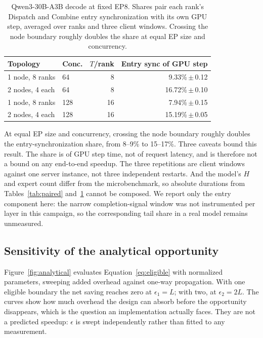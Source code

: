 \begin{table}[t]
\centering\small
\setlength{\tabcolsep}{5pt}
\begin{tabular}{llrr}
\toprule
Topology & Conc. & $T$/rank & Entry sync of GPU step\\
\midrule
1 node, 8 ranks & 64  & 8  & 9.33\%\,$\pm$\,0.12\\
2 nodes, 4 each & 64  & 8  & 16.72\%\,$\pm$\,0.10\\
1 node, 8 ranks & 128 & 16 & 7.94\%\,$\pm$\,0.15\\
2 nodes, 4 each & 128 & 16 & 15.19\%\,$\pm$\,0.05\\
\bottomrule
\end{tabular}
\caption{Qwen3-30B-A3B decode at fixed EP8. Shares pair each rank's Dispatch and
Combine entry synchronization with its own GPU step, averaged over ranks and three
client windows. Crossing the node boundary roughly doubles the share at equal EP size
and concurrency.}
\label{tab:e2e}
\end{table}

At equal EP size and concurrency, crossing the node boundary roughly doubles the
entry-synchronization share, from 8--9\% to 15--17\%. Three caveats bound this result.
The share is of GPU step time, not of request latency, and is therefore not a bound on
any end-to-end speedup. The three repetitions are client windows against one server
instance, not three independent restarts. And the model's $H$ and expert count differ
from the microbenchmark, so absolute durations from Tables~\ref{tab:paired}
and~\ref{tab:e2e} cannot be composed. We report only the entry component here: the
narrow completion-signal window was not instrumented per layer in this campaign, so the
corresponding tail share in a real model remains unmeasured.

\subsection{Sensitivity of the analytical opportunity}
\label{sec:sensitivity}

Figure~\ref{fig:analytical} evaluates Equation~\eqref{eq:eligible} with normalized
parameters, sweeping added overhead against one-way propagation. With one eligible
boundary the net saving reaches zero at $\epsilon_1 = L$; with two, at
$\epsilon_2 = 2L$. The curves show how much overhead the design can absorb before the
opportunity disappears, which is the question an implementation actually faces. They
are not a predicted speedup: $\epsilon$ is swept independently rather than fitted to
any measurement.

